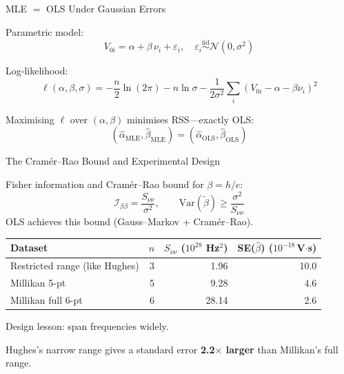\documentclass[aspectratio=169]{beamer}
\begin{document}
\begin{frame}{MLE $=$ OLS Under Gaussian Errors}

Parametric model:
\[
  V_{0i} = \alpha + \beta\,\nu_i + \varepsilon_i,
  \quad
  \varepsilon_i \overset{\text{iid}}{\sim} \mathcal{N}(0,\sigma^2)
\]

Log-likelihood:
\[
  \ell(\alpha,\beta,\sigma) =
  -\frac{n}{2}\ln(2\pi) - n\ln\sigma
  - \frac{1}{2\sigma^2}\sum_{i}(V_{0i}-\alpha-\beta\nu_i)^2
\]

Maximising $\ell$ over $(\alpha,\beta)$ minimises RSS---exactly OLS:
\[
  (\hat\alpha_{\mathrm{MLE}},\hat\beta_{\mathrm{MLE}}) =
         (\hat\alpha_{\mathrm{OLS}},\hat\beta_{\mathrm{OLS}})
\]
%

\end{frame}

\begin{frame}{The Cram\'er--Rao Bound and Experimental Design}

Fisher information and Cram\'er--Rao bound for $\beta = h/e$:
\[
  \mathcal{I}_{\beta\beta} = \frac{S_{\nu\nu}}{\sigma^2},
  \qquad
  \mathrm{Var}(\tilde\beta) \geq \frac{\sigma^2}{S_{\nu\nu}}
\]
OLS achieves this bound (Gauss--Markov + Cram\'er--Rao).

\medskip
\begin{center}
\small
\begin{tabular}{p{5.3cm}rrr}
\toprule
Dataset & $n$ & $S_{\nu\nu}$ ($10^{28}$ Hz$^2$) & SE($\hat\beta$) ($10^{-18}$\,V$\cdot$s) \\
\midrule
Restricted range (like Hughes) & 3 & 1.96  & 10.0 \\
Millikan 5-pt                  & 5 & 9.28  &  4.6 \\
Millikan full 6-pt             & 6 & 28.14 &  2.6 \\
\bottomrule
\end{tabular}
\end{center}

\medskip
Design lesson: span frequencies widely.

Hughes's narrow range gives a standard error \textbf{2.2$\times$ larger}
than Millikan's full range.

\end{frame}
\end{document}
